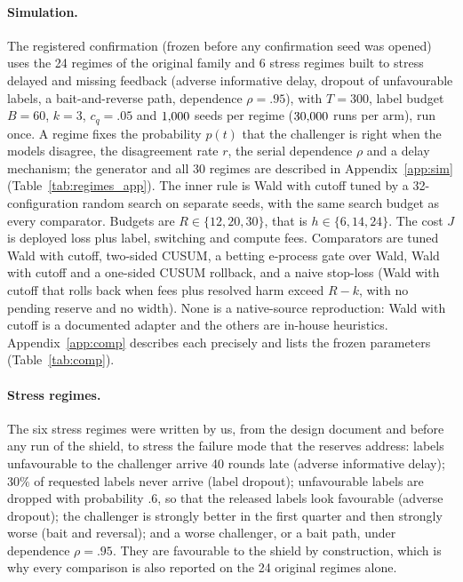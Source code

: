 \documentclass[10pt]{article}
\theoremstyle{plain}
\theoremstyle{definition}
\begin{document}
\paragraph{Simulation.}
The registered confirmation (frozen before any confirmation seed was opened) uses the 24 regimes of the original family and 6 stress regimes built to stress delayed and missing feedback (adverse informative delay, dropout of unfavourable labels, a bait-and-reverse path, dependence $\rho=.95$), with $T=300$, label budget $B=60$, $k=3$, $c_q=.05$ and $1{,}000$ seeds per regime ($30{,}000$ runs per arm), run once. A regime fixes the probability $p(t)$ that the challenger is right when the models disagree, the disagreement rate $r$, the serial dependence $\rho$ and a delay mechanism; the generator and all 30 regimes are described in Appendix~\ref{app:sim} (Table~\ref{tab:regimes_app}).
The inner rule is Wald with cutoff tuned by a 32-configuration random search on separate seeds, with the same search budget as every comparator. Budgets are $R\in\{12,20,30\}$, that is $h\in\{6,14,24\}$. The cost $J$ is deployed loss plus label, switching and compute fees.
Comparators are tuned Wald with cutoff, two-sided CUSUM, a betting e-process gate over Wald, Wald with cutoff and a one-sided CUSUM rollback, and a naive stop-loss (Wald with cutoff that rolls back when fees plus resolved harm exceed $R-k$, with no pending reserve and no width). None is a native-source reproduction: Wald with cutoff is a documented adapter and the others are in-house heuristics. Appendix~\ref{app:comp} describes each precisely and lists the frozen parameters (Table~\ref{tab:comp}).

\paragraph{Stress regimes.}
The six stress regimes were written by us, from the design document and before any run of the shield, to stress the failure mode that the reserves address: labels unfavourable to the challenger arrive 40 rounds late (adverse informative delay); $30\%$ of requested labels never arrive (label dropout); unfavourable labels are dropped with probability $.6$, so that the released labels look favourable (adverse dropout); the challenger is strongly better in the first quarter and then strongly worse (bait and reversal); and a worse challenger, or a bait path, under dependence $\rho=.95$. They are favourable to the shield by construction, which is why every comparison is also reported on the 24 original regimes alone.
\end{document}
